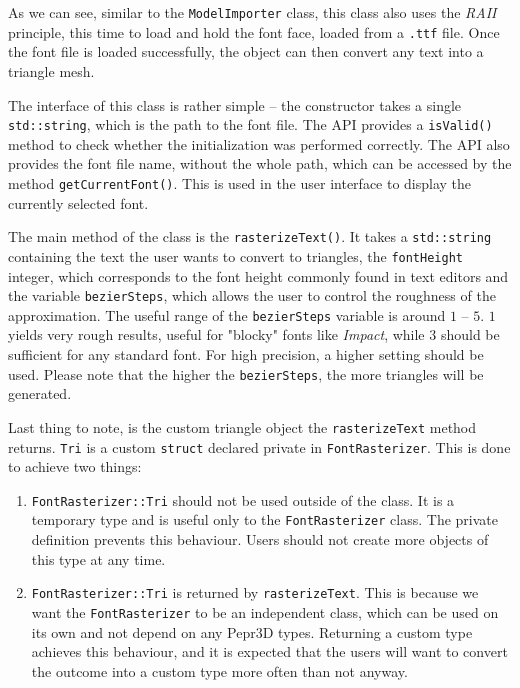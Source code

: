 As we can see, similar to the \texttt{ModelImporter} class, this class also uses the \textit{RAII} principle, this time to load and hold the font face, loaded from a \texttt{.ttf} file. Once the font file is loaded successfully, the object can then convert any text into a triangle mesh.

The interface of this class is rather simple -- the constructor takes a single \texttt{std::string}, which is the path to the font file. The API provides a \texttt{isValid()} method to check whether the initialization was performed correctly. The API also provides the font file name, without the whole path, which can be accessed by the method \texttt{getCurrentFont()}. This is used in the user interface to display the currently selected font.

The main method of the class is the \texttt{rasterizeText()}. It takes a \texttt{std::string} containing the text the user wants to convert to triangles, the \texttt{fontHeight} integer, which corresponds to the font height commonly found in text editors and the variable \texttt{bezierSteps}, which allows the user to control the roughness of the approximation. The useful range of the \texttt{bezierSteps} variable is around $1$ -- $5$. $1$ yields very rough results, useful for "blocky" fonts like \textit{Impact}, while $3$ should be sufficient for any standard font. For high precision, a higher setting should be used. Please note that the higher the \texttt{bezierSteps}, the more triangles will be generated.

Last thing to note, is the custom triangle object the \texttt{rasterizeText} method returns. \texttt{Tri} is a custom \texttt{struct} declared private in \texttt{FontRasterizer}. This is done to achieve two things: 

\begin{enumerate}
\item \texttt{FontRasterizer::Tri} should not be used outside of the class. It is a temporary type and is useful only to the \texttt{FontRasterizer} class. The private definition prevents this behaviour. Users should not create more objects of this type at any time.

\item \texttt{FontRasterizer::Tri} is returned by \texttt{rasterizeText}. This is because we want the \texttt{FontRasterizer} to be an independent class, which can be used on its own and not depend on any Pepr3D types. Returning a custom type achieves this behaviour, and it is expected that the users will want to convert the outcome into a custom type more often than not anyway.
\end{enumerate}

